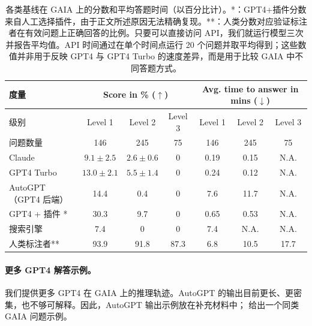 \documentclass{fairmeta}
\newcommand{\benchmark}{\textsc{GAIA}}
\begin{document}
\begin{table}[]
\small
 \centering
 \begin{tabular}{lcccccc}
 \toprule
 度量& \multicolumn{3}{c}{Score in \% ($\uparrow$)} & \multicolumn{3}{c}{Avg. time to answer in mins ($\downarrow$)} \\
 \midrule
 级别&Level 1&Level 2&Level 3&Level 1&Level 2&Level 3\\
 \midrule
 问题数量& 146 & 245 & 75 & 146 & 245 & 75 \\
 \midrule 
 Claude& $9.1 \pm 2.5$ & $2.6 \pm 0.6$ & 0 & 0.19 & 0.15 & N.A.\\
 GPT4 Turbo& $13.0 \pm 2.1$ & $5.5 \pm 1.4$ & 0 & 0.24 & 0.12 & N.A. \\
 AutoGPT（GPT4 后端）& 14.4 & 0.4 & 0 & 7.6 & 11.7 & N.A. \\
 GPT4 + 插件 *& 30.3 & 9.7 &
 0 & 0.65 & 0.53 & N.A. \\
 \midrule
 搜索引擎& 7.4 & 0 & 0 & 7.4 & N.A. & N.A. \\
 人类标注者**& 93.9 & 91.8 & 87.3 & 6.8 & 10.5 & 17.7 \\

 \bottomrule
 \end{tabular}
 \caption{各类基线在 GAIA 上的分数和平均答题时间（以百分比计）。*：GPT4+插件分数来自人工选择插件，由于正文所述原因无法精确复现。**：人类分数对应验证标注者在有效问题上正确回答的比例。只要可以直接访问 API，我们就运行模型三次并报告平均值。API 时间通过在单个时间点运行 20 个问题并取平均得到；这些数值并非用于反映 GPT4 与 GPT4 Turbo 的速度差异，而是用于比较 \benchmark{} 中不同答题方式。}
 \label{tab:detailed_eval_results}
\end{table}

\paragraph{更多 GPT4 解答示例。} 我们提供更多 GPT4 在 \benchmark{} 上的推理轨迹。AutoGPT 的输出目前更长、更密集，也不够可解释。因此，AutoGPT 输出示例放在补充材料中； 给出一个同类 \benchmark{} 问题示例。
\end{document}
